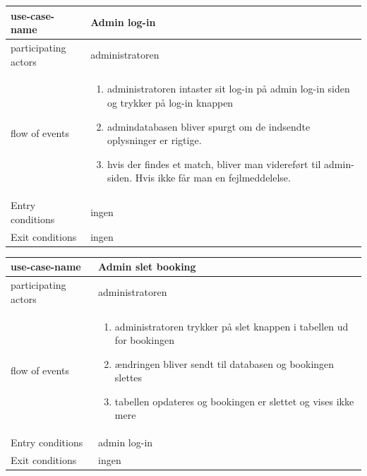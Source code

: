 \documentclass[12pt,a4paper]{article}
\begin{document}
\begin{minipage}{\textwidth}

 \label{tab:title}
\begin{tabular}{| p{5cm} p{10cm} |}
\hline use-case-name & Admin log-in \\
\hline participating actors & administratoren \\
\hline flow of events & \begin{enumerate}
\item administratoren intaster sit log-in på admin log-in siden og trykker på log-in knappen
\item admindatabasen bliver spurgt om de indsendte oplysninger er rigtige.
\item hvis der findes et match, bliver man videreført til admin-siden. Hvis ikke får man en fejlmeddelelse.
\end{enumerate} \\
\hline Entry conditions & ingen \\
\hline Exit conditions & ingen \\
\hline
\end{tabular}

\end{minipage}

\bigskip

\begin{minipage}{\textwidth}

 \label{tab:title}
\begin{tabular}{| p{5cm} p{10cm} |}
\hline use-case-name & Admin slet booking \\
\hline participating actors & administratoren \\
\hline flow of events & \begin{enumerate}
\item administratoren trykker på slet knappen i tabellen ud for bookingen 
\item ændringen bliver sendt til databasen og bookingen slettes
\item tabellen opdateres og bookingen er slettet og vises ikke mere
\end{enumerate} \\
\hline Entry conditions & admin log-in \\
\hline Exit conditions & ingen \\
\hline
\end{tabular}

\end{minipage}
	
\end{document}
